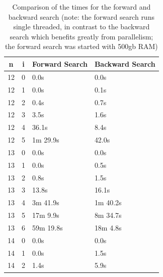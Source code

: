 \documentclass[10pt,journal,compsoc]{IEEEtran}
\begin{document}
\begin{table}[!t]
  \renewcommand{\arraystretch}{1.2}
  \caption{Comparison of the times for the forward and backward search (note: the forward search runs single threaded, in contrast to the backward search which benefits greatly from parallelism; the forward search was started with 500gb RAM)}
  \label{table:search_algorithms}
  \centering
  \begin{tabular}{c|c|l|l}
    \textbf{n} & \textbf{i} & \textbf{Forward Search}  & \textbf{Backward Search} \\ \hline
    12         & 0          & 0.0s                     & 0.0s                     \\
    12         & 1          & 0.0s                     & 0.1s                     \\
    12         & 2          & 0.4s                     & 0.7s                     \\
    12         & 3          & 3.5s                     & 1.6s                     \\
    12         & 4          & 36.1s                    & 8.4s                     \\
    12         & 5          & 1m 29.9s                 & 42.0s                    \\
    \hline
    13         & 0          & 0.0s                     & 0.0s                     \\
    13         & 1          & 0.0s                     & 0.5s                     \\
    13         & 2          & 0.8s                     & 1.5s                     \\
    13         & 3          & 13.8s                    & 16.1s                    \\
    13         & 4          & 3m 41.9s                 & 1m 40.2s                 \\
    13         & 5          & 17m 9.9s                 & 8m 34.7s                 \\
    13         & 6          & 59m 19.8s                & 18m 4.8s                 \\
    \hline
    14         & 0          & 0.0s                     & 0.0s                     \\
    14         & 1          & 0.0s                     & 1.5s                     \\
    14         & 2          & 1.4s                     & 5.9s                     \\

\end{tabular}
\end{table}
\end{document}
